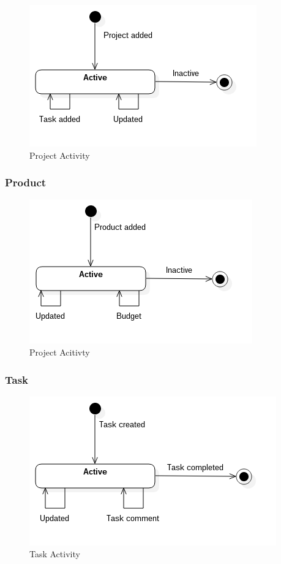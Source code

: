 \begin{figure}[H]
    \centering
    \includegraphics[scale=0.6]{Images/ProblemDomain/projectActivityDiagram.png}
    \caption{Project Activity}
    \label{fig:projectActivityDiagram}
\end{figure}

\subsubsection*{Product}

\begin{figure}[H]
    \centering
    \includegraphics[scale=0.6]{Images/ProblemDomain/productActivityDiagram.png}
    \caption{Project Acitivty}
    \label{fig:productAcitvityDiagram}
\end{figure}

\subsubsection*{Task}

\begin{figure}[H]
    \centering
    \includegraphics[scale=0.6]{Images/ProblemDomain/taskActivityDiagram.png}
    \caption{Task Activity}
    \label{fig:taskActivityDiagram}
\end{figure}

